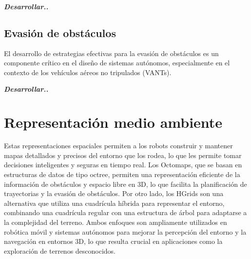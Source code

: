 \textit{\textbf{Desarrollar..}}

\subsection{Evasión de obstáculos}

El desarrollo de estrategias efectivas para la evasión de obstáculos es un componente crítico en el diseño de sistemas autónomos, especialmente en el contexto de los vehículos aéreos no tripulados (VANTs).

\textit{\textbf{Desarrollar..}}

\section{Representación medio ambiente}


Estas representaciones espaciales permiten a los robots construir y mantener mapas detallados y precisos del entorno que los rodea, lo que les permite tomar decisiones inteligentes y seguras en tiempo real. Los Octomaps, que se basan en estructuras de datos de tipo octree, permiten una representación eficiente de la información de obstáculos y espacio libre en 3D, lo que facilita la planificación de trayectorias y la evasión de obstáculos. Por otro lado, los HGrids son una alternativa que utiliza una cuadrícula híbrida para representar el entorno, combinando una cuadrícula regular con una estructura de árbol para adaptarse a la complejidad del terreno. Ambos enfoques son ampliamente utilizados en robótica móvil y sistemas autónomos para mejorar la percepción del entorno y la navegación en entornos 3D, lo que resulta crucial en aplicaciones como la exploración de terrenos desconocidos.


